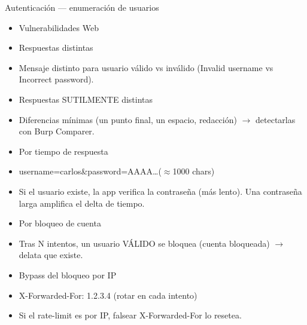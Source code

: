 \documentclass[aspectratio=169,10pt]{beamer}
\begin{document}
\begin{frame}[allowframebreaks]{Autenticación --- enumeración de usuarios}
\small
  \begin{itemize}
  \item Vulnerabilidades Web
  \item Respuestas distintas
  \item Mensaje distinto para usuario válido vs inválido (Invalid username vs Incorrect password).
  \item Respuestas SUTILMENTE distintas
  \item Diferencias mínimas (un punto final, un espacio, redacción) $\rightarrow$ detectarlas con Burp Comparer.
  \item Por tiempo de respuesta
  \item username=carlos\&password=AAAA\dots{}($\approx$1000 chars)
  \item Si el usuario existe, la app verifica la contraseña (más lento). Una contraseña larga amplifica el delta de tiempo.
  \item Por bloqueo de cuenta
  \item Tras N intentos, un usuario VÁLIDO se bloquea (cuenta bloqueada) $\rightarrow$ delata que existe.
  \item Bypass del bloqueo por IP
  \item X-Forwarded-For: 1.2.3.4 (rotar en cada intento)
  \item Si el rate-limit es por IP, falsear X-Forwarded-For lo resetea.
  \end{itemize}
\end{frame}
\end{document}
